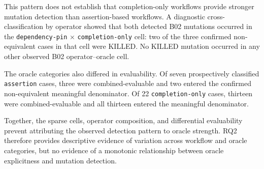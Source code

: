 

This pattern does not establish that completion-only workflows provide
stronger mutation detection than assertion-based workflows. A diagnostic
cross-classification by operator showed that both detected B02 mutations
occurred in the \texttt{dependency-pin} $\times$
\texttt{completion-only} cell: two of the three confirmed non-equivalent
cases in that cell were KILLED. No KILLED mutation occurred in any other
observed B02 operator--oracle cell.

The oracle categories also differed in evaluability. Of seven prospectively
classified \texttt{assertion} cases, three were combined-evaluable and two
entered the confirmed non-equivalent meaningful denominator. Of 22
\texttt{completion-only} cases, thirteen were combined-evaluable and all
thirteen entered the meaningful denominator.

Together, the sparse cells, operator composition, and differential
evaluability prevent attributing the observed detection pattern to oracle
strength. RQ2 therefore provides descriptive evidence of variation across
workflow and oracle categories, but no evidence of a monotonic relationship
between oracle explicitness and mutation detection.

\FloatBarrier

